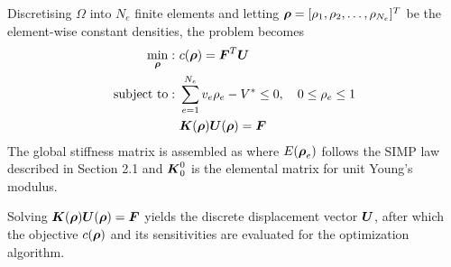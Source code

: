 \documentclass[mathpazo]{cicp}
\begin{document}
Discretising $\Omega$ into $N_e$ finite elements and letting $\boldsymbol{\rho} = [\rho_1, \rho_2, \dots, \rho_{N_e}]^T$ be the element-wise constant densities, the problem becomes
\begin{equation}\label{eq:cmpd}
	\begin{aligned} 
		\min_{\boldsymbol{\rho}}:
		&~c(\boldsymbol{\rho}) = \boldsymbol{F}^T\boldsymbol{U}\\ 
		\text{subject~to}:
		&~\sum_{e=1}^{N_e} v_e\rho_e - V^*\leq0,\quad0\leq\rho_e\leq1\\
		&~\boldsymbol{K}(\boldsymbol{\rho})\boldsymbol{U}(\boldsymbol{\rho}) = \boldsymbol{F}\\ 
	\end{aligned}
\end{equation}
The global stiffness matrix is assembled as
where $E(\boldsymbol{\rho}_e)$ follows the SIMP law described in Section 2.1 and $\boldsymbol{K}_0^0$ is the elemental matrix for unit Young’s modulus.

Solving $\boldsymbol{K}(\boldsymbol{\rho})\boldsymbol{U}(\boldsymbol{\rho}) = \boldsymbol{F}$ yields the discrete displacement vector $\boldsymbol{U}$, after which the objective $c(\boldsymbol{\rho})$ and its sensitivities are evaluated for the optimization algorithm.
\end{document}
